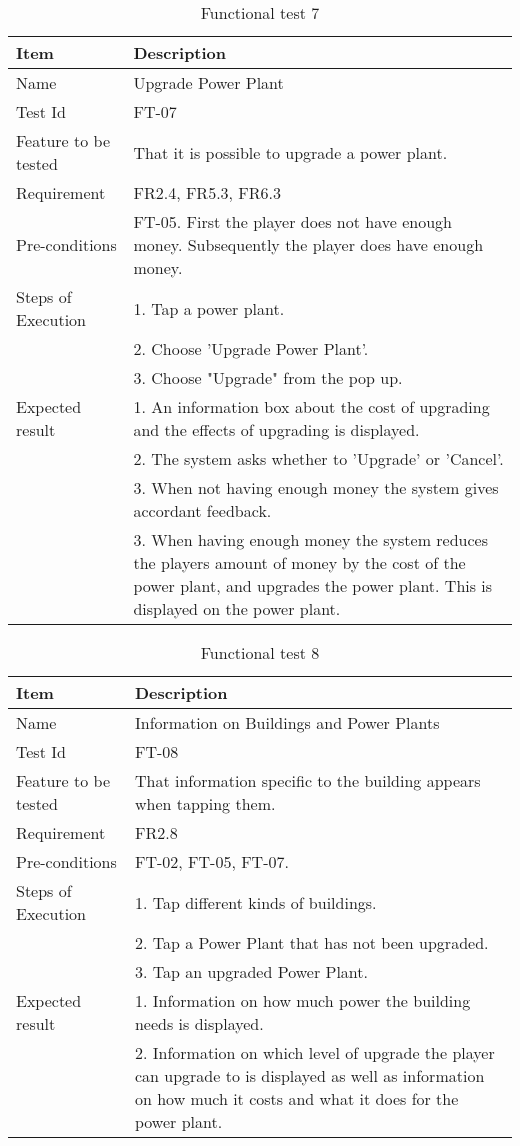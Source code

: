 \begin{table}[H]
\centering
	\begin{tabular}{ l | p{8cm} }
		\hline
		{\bf Item} & {\bf Description} \\ \hline
		Name & Upgrade Power Plant\\ 
		Test Id & FT-07 \\ 
		Feature to be tested & That it is possible to upgrade a power plant. \\ 
		Requirement & FR2.4, FR5.3, FR6.3 \\ 
		Pre-conditions & FT-05. First the player does not have enough money. Subsequently the player does have enough money. \\ 
		Steps of Execution & 1. Tap a power plant. \\ 
		& 2. Choose 'Upgrade Power Plant'. \\
		& 3. Choose "Upgrade" from the pop up. \\
		Expected result & 1. An information box about the cost of upgrading and the effects of upgrading is displayed. \\
		& 2. The system asks whether to 'Upgrade' or 'Cancel'. \\
		& 3. When not having enough money the system gives accordant feedback. \\
		& 3. When having enough money the system reduces the players amount of money by the cost of the power plant, and upgrades the power plant. This is displayed on the power plant. \\
	\end{tabular}
	\caption{Functional test 7}
\end{table}

\begin{table}[H]
\centering
	\begin{tabular}{ l | p{8cm} }
		\hline
		{\bf Item} & {\bf Description} \\ \hline
		Name & Information on Buildings and Power Plants \\ 
		Test Id & FT-08 \\ 
		Feature to be tested & That information specific to the building appears when tapping them. \\ 
		Requirement & FR2.8 \\ 
		Pre-conditions & FT-02, FT-05, FT-07. \\ 
		Steps of Execution & 1. Tap different kinds of buildings. \\
		& 2. Tap a Power Plant that has not been upgraded. \\
		& 3. Tap an upgraded Power Plant. \\
		Expected result & 1. Information on how much power the building needs is displayed. \\
		& 2. Information on which level of upgrade the player can upgrade to is displayed as well as information on how much it costs and what it does for the power plant. \\
	\end{tabular}
	\caption{Functional test 8}
\end{table}

